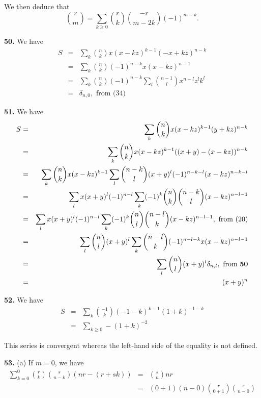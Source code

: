 \documentclass[a4paper,12pt]{article}
\newcommand{\newpar}[1]{\bigskip \noindent \textbf{#1.}}
\newcommand{\subpar}[1]{\medskip \noindent (#1)}
\begin{document}
We then deduce that
\[  {r \choose m} =  \sum_{k \ge 0} {r \choose k}{-r \choose
  m-2k}(-1)^{m-k} .\]

\newpar{50} We have
\begin{eqnarray*}
  S &=&  \sum_k {n \choose k} x(x-kz)^{k-1}(-x + kz)^{n-k} \\
  &=& \sum_k {n
    \choose k} (-1)^{n-k} x (x - kz)^{n-1} \\
  &=& \sum_k {n \choose k} (-1)^{n-k} \sum_l {n-1 \choose l}
  x^{n-l}z^l k^l \\
  &=& \delta_{n,0}, \mbox{ from (34)}
\end{eqnarray*}

\newpar{51} We have
\begin{eqnarray*}
 S &=&  \sum_k {n \choose k} x (x-kz)^{k-1}(y+kz)^{n-k} \\
 &=&  \sum_k {n \choose k} x (x-kz)^{k-1}((x+y) - (x-kz))^{n-k} \\
 &=& \sum_k {n \choose k} x(x-kz)^{k-1} \sum_l {n-k \choose l} (x+y)^l
 (-1)^{n-k-l}(x-kz)^{n-k-l} \\
 &=& \sum_l x (x+y)^l (-1)^{n-l} \sum_k (-1)^k {n \choose k}{n - k
   \choose l}(x - kz)^{n-l-1} \\
 &=& \sum_l x (x+y)^l (-1)^{n-l} \sum_k (-1)^k {n \choose l}{n-l
   \choose k} (x-kz)^{n-l-1}, \mbox{ from (20)} \\
 &=& \sum_l {n \choose l}(x+y)^l \sum_k {n-l \choose k}(-1)^{n-l-k} x(x -
 kz)^{n-l-1} \\
 &=& \sum_l {n \choose l}(x+y)^l \delta_{n,l}, \mbox{ from \textbf{50}} \\
 &=& (x+y)^n
\end{eqnarray*}

\newpar{52} We have
\begin{eqnarray*}
  S &=& \sum_k {-1 \choose k}(-1-k)^{k-1}(1+k)^{-1-k} \\
  &=& \sum_{k\ge 0} - (1+k)^{-2}
\end{eqnarray*}

This series is convergent whereas the left-hand side of the equality
is not defined.

\newpar{53} \subpar{a} If $m=0$, we have
\begin{eqnarray*}
  \sum_{k=0}^0 {r \choose k} {s \choose n-k} (nr-(r+sk)) &=& {s
    \choose n}nr \\
  &=& (0+1)(n-0) {r \choose 0+1}{s \choose n-0}
\end{eqnarray*}
\end{document}
